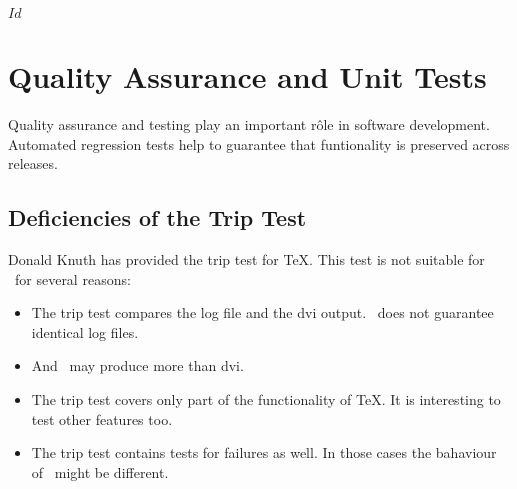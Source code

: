 \SVN$Id$
\chapter{Quality Assurance and Unit Tests}\label{chapter:testing}

Quality assurance and testing play an important r\^ole in software
development. Automated regression tests help to guarantee that
funtionality is preserved across releases.


\section{Deficiencies of the Trip Test}

Donald Knuth has provided the trip test for \TeX.
This test is not suitable for \ExTeX\ for several reasons:
\begin{itemize}
\item The trip test compares the log file and the dvi
  output. \ExTeX\ does not guarantee identical log files.
\item And \ExTeX\ may produce more than dvi.
\item The trip test covers only part of the functionality of \TeX. It
  is interesting to test other features too.
\item The trip test contains tests for failures as well. In those
  cases the bahaviour of \ExTeX\ might be different.
\end{itemize}

